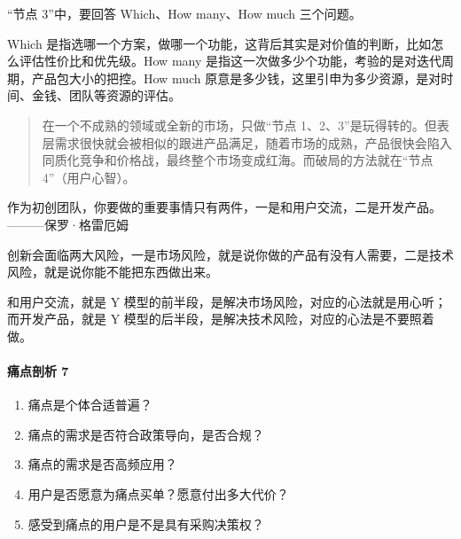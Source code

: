 \documentclass[letterpaper,11pt,english]{sphinxmanual}
\begin{document}
“节点 3”中，要回答 Which、How many、How much 三个问题。

Which
是指选哪一个方案，做哪一个功能，这背后其实是对价值的判断，比如怎么评估性价比和优先级。How
many 是指这一次做多少个功能，考验的是对迭代周期，产品包大小的把控。How
much
原意是多少钱，这里引申为多少资源，是对时间、金钱、团队等资源的评估。
\begin{quote}

在一个不成熟的领域或全新的市场，只做“节点
1、2、3”是玩得转的。但表层需求很快就会被相似的跟进产品满足，随着市场的成熟，产品很快会陷入同质化竞争和价格战，最终整个市场变成红海。而破局的方法就在“节点
4”（用户心智）。
\end{quote}

作为初创团队，你要做的重要事情只有两件，一是和用户交流，二是开发产品。
———保罗·格雷厄姆

创新会面临两大风险，一是市场风险，就是说你做的产品有没有人需要，二是技术风险，就是说你能不能把东西做出来。

和用户交流，就是 Y
模型的前半段，是解决市场风险，对应的心法就是用心听；而开发产品，就是 Y
模型的后半段，是解决技术风险，对应的心法是不要照着做。


\paragraph{痛点剖析 7\sphinxfootnotemark[467]}
\label{\detokenize{chapter_knowledge/need_analysis:id5}}%
\begin{footnotetext}[467]\sphinxAtStartFootnote
{}
%
\end{footnotetext}\ignorespaces \begin{enumerate}
%
\item {} 
痛点是个体合适普遍？

\item {} 
痛点的需求是否符合政策导向，是否合规？

\item {} 
痛点的需求是否高频应用？

\item {} 
用户是否愿意为痛点买单？愿意付出多大代价？

\item {} 
感受到痛点的用户是不是具有采购决策权？

\end{enumerate}
\end{document}
